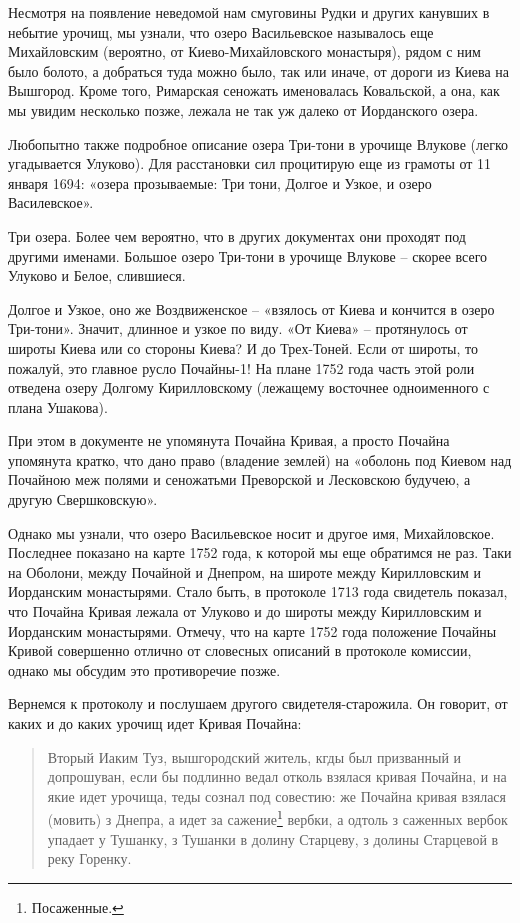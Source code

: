 Несмотря на появление неведомой нам смуговины Рудки и других канувших в небытие урочищ, мы узнали, что озеро Васильевское называлось еще Михайловским (вероятно, от Киево-Михайловского монастыря), рядом с ним было болото, а добраться туда можно было, так или иначе, от дороги из Киева на Вышгород. Кроме того, Римарская сеножать именовалась Ковальской, а она, как мы увидим несколько позже, лежала не так уж далеко от Иорданского озера.

Любопытно также подробное описание озера Три-тони в урочище Влукове (легко угадывается Улуково). Для расстановки сил процитирую еще из грамоты от 11 января 1694: «озера прозываемые: Три тони, Долгое и Узкое, и озеро Василевское».

Три озера. Более чем вероятно, что в других документах они проходят под другими именами. Большое озеро Три-тони в урочище Влукове – скорее всего Улуково и Белое, слившиеся.

Долгое и Узкое, оно же Воздвиженское – «взялось от Киева и кончится в озеро Три-тони». Значит, длинное и узкое по виду. «От Киева» – протянулось от широты Киева или со стороны Киева? И до Трех-Тоней. Если от широты, то пожалуй, это главное русло Почайны-1! На плане 1752 года часть этой роли отведена озеру Долгому Кирилловскому (лежащему восточнее одноименного с плана Ушакова).

При этом в документе не упомянута Почайна Кривая, а просто Почайна упомянута кратко, что дано право (владение землей) на «оболонь под Киевом над Почайною меж полями и сеножатьми Преворской и Лесковскою будучею, а другую Свершковскую».

Однако мы узнали, что озеро Васильевское носит и другое имя, Михайловское. Последнее показано на карте 1752 года, к которой мы еще обратимся не раз. Таки на Оболони, между Почайной и Днепром, на широте между Кирилловским и Иорданским монастырями. Стало быть, в протоколе 1713 года свидетель показал, что Почайна Кривая лежала от Улуково и до широты между Кирилловским и Иорданским монастырями. Отмечу, что на карте 1752 года положение Почайны Кривой совершенно отлично от словесных описаний в протоколе комиссии, однако мы обсудим это противоречие позже.
 
Вернемся к протоколу и послушаем другого свидетеля-старожила. Он говорит, от каких и до каких урочищ идет Кривая Почайна:

\begin{quotation}
Вторый Иаким Туз, вышгородский житель, кгды был призванный и допрошуван, если бы подлинно ведал отколь взялася кривая Почайна, и на якие идет урочища, теды сознал под совестию: же Почайна кривая взялася (мовить) з Днепра, а идет за сажение\footnote{Посаженные.} вербки, а одтоль з саженных вербок упадает у Тушанку, з Тушанки в долину Старцеву, з долины Старцевой в реку Горенку.
\end{quotation}

